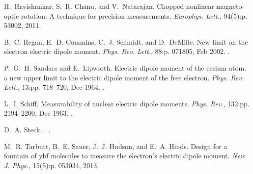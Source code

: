 \begin{thebibliography}{99}
H.~Ravishankar, S.~R. Chanu, and V.~Natarajan.
\newblock Chopped nonlinear magneto-optic rotation: A technique for precision
  measurements.
\newblock \emph{Europhys. Lett.}, 94(5):p. 53002, 2011.

B.~C. Regan, E.~D. Commins, C.~J. Schmidt, and D.~DeMille.
\newblock New limit on the electron electric dipole moment.
\newblock \emph{Phys. Rev. Lett.}, 88:p. 071805, Feb 2002.
\newblock {}.

P.~G.~H. Sandars and E.~Lipworth.
\newblock Electric dipole moment of the cesium atom. a new upper limit to the
  electric dipole moment of the free electron.
\newblock \emph{Phys. Rev. Lett.}, 13:pp. 718--720, Dec 1964.
\newblock {}.

L.~I. Schiff.
\newblock Measurability of nuclear electric dipole moments.
\newblock \emph{Phys. Rev.}, 132:pp. 2194--2200, Dec 1963.
\newblock {}.

D.~A. Steck.
.
.

M.~R. Tarbutt, B.~E. Sauer, J.~J. Hudson, and E.~A. Hinds.
\newblock Design for a fountain of ybf molecules to measure the electron's
  electric dipole moment.
\newblock \emph{New J. Phys.}, 15(5):p. 053034, 2013.

\end{thebibliography}


